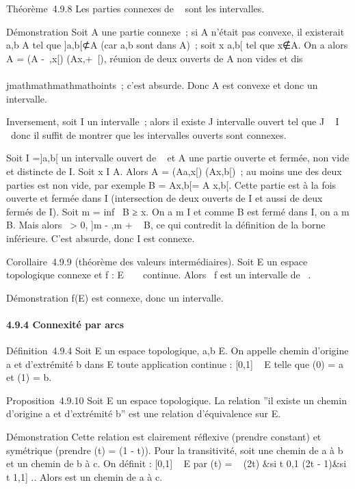 Théorème~4.9.8 Les parties connexes de ~ sont les intervalles.

Démonstration Soit A une partie connexe~; si A n'était pas convexe, il
existerait a,b \in A tel que {]}a,b{[}⊄A (car a,b sont dans A)~; soit x
\in{]}a,b{[} tel que x∉A. On a alors A = (A\bigcap{]}
-\infty~,x{[}) \cup (A\bigcap{]}x,+\infty~{[}), réunion de deux ouverts de A non vides et
dis\\\\jmathmathmathmathoints~; c'est absurde. Donc A est convexe et donc un intervalle.

Inversement, soit I un intervalle~; alors il existe J intervalle ouvert
tel que J \subset~ I \subset~\overlineJ donc il suffit de montrer
que les intervalles ouverts sont connexes.

Soit I ={]}a,b{[} un intervalle ouvert de ~ et A une partie ouverte et
fermée, non vide et distincte de I. Soit x \in I \diagdown A. Alors A =
(A\bigcap{]}a,x{[}) \cup (A\bigcap{]}x,b{[})~; au moins une des deux parties est non
vide, par exemple B = A\bigcap{]}x,b{[}= A \bigcap {[}x,b{[}. Cette partie est à la
fois ouverte et fermée dans I (intersection de deux ouverts de I et
aussi de deux fermés de I). Soit m = inf~ B ≥
x. On a m \in I et comme B est fermé dans I, on a m \in B. Mais alors
\exists~\epsilon \textgreater{} 0, {]}m - \epsilon,m + \epsilon{[}\subset~ B, ce
qui contredit la définition de la borne inférieure. C'est absurde, donc
I est connexe.

Corollaire~4.9.9 (théorème des valeurs intermédiaires). Soit E un espace
topologique connexe et f : E \rightarrow~ ~ continue. Alors
\mathrmIm~f est un
intervalle de ~.

Démonstration f(E) est connexe, donc un intervalle.

\paragraph{4.9.4 Connexité par arcs}

Définition~4.9.4 Soit E un espace topologique, a,b \in E. On appelle
chemin d'origine a et d'extrémité b dans E toute application continue \gamma
: {[}0,1{]} \rightarrow~ E telle que \gamma(0) = a et \gamma(1) = b.

Proposition~4.9.10 Soit E un espace topologique. La relation ''il existe
un chemin d'origine a et d'extrémité b'' est une relation d'équivalence
sur E.

Démonstration Cette relation est clairement réflexive (prendre \gamma
constant) et symétrique (prendre (t) = \gamma(1 - t)). Pour la
transitivité, soit  une chemin de a à b et  un
chemin de b à c. On définit \gamma : {[}0,1{]} \rightarrow~ E par \gamma(t) =
\left \ \cases
{}(2t) &si t \in {[}0,1\diagup2{]} \cr {}(2t
- 1)&si t \in {[}1,1{]} \cr  \right ..
Alors \gamma est un chemin de a à c.


